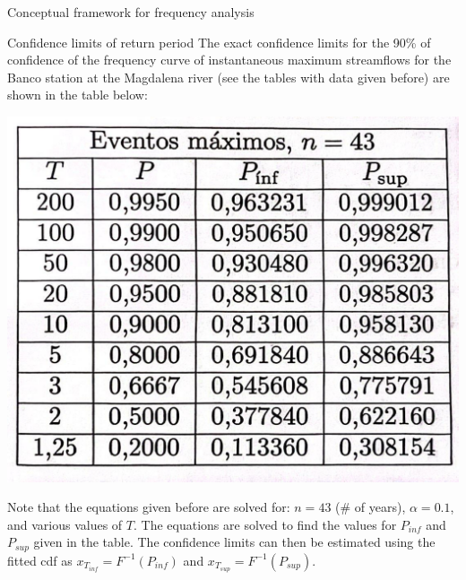 \documentclass[8pt]{beamer}
\renewcommand{\emph}[1]{\textcolor{myorange}{#1}}
\begin{document}
\begin{frame}{Conceptual framework for  frequency analysis}
 \begin{exampleblock}{Confidence limits of return period} %
     The exact confidence limits for the 90\% of confidence of the frequency curve of instantaneous maximum streamflows for the Banco station at the Magdalena river (see the tables with data given before) are shown in the table below:

     \begin{center}
\includegraphics[width=0.5\linewidth]{taM26.jpeg}  %
     \end{center}

     Note that the equations given before are solved for: $n=43$ (\# of years), $\alpha = 0.1$, and various values of $T$. The equations are solved to find the values for $P_{inf}$ and $P_{sup}$ given in the table. The confidence limits can then be estimated using the fitted \emph{cdf} as $x_{T_{inf}} = F^{-1} (P_{inf})$ and $x_{T_{sup}} = F^{-1} (P_{sup})$.
 \end{exampleblock}

\end{frame}
\end{document}
